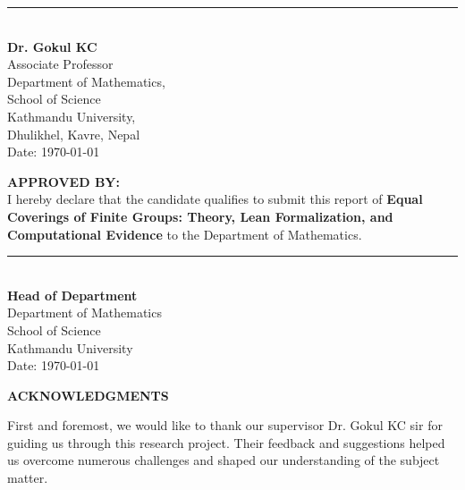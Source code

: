 \documentclass[12pt, a4paper]{article}
\theoremstyle{plain}
\theoremstyle{definition}
\begin{document}
\begin{titlepage}
\vspace{3em}

\noindent
\begin{minipage}{0.45\textwidth}
\rule{6cm}{0.5pt}\\
\textbf{Dr. Gokul KC }\\
Associate Professor\\
Department of Mathematics,\\
School of Science\\ Kathmandu University,\\
Dhulikhel, Kavre, Nepal\\
Date: {\today}

\end{minipage}


\vspace{2.5em}

\noindent

\textbf{APPROVED BY:}\\
I hereby declare that the candidate qualifies to submit this report of \textbf{Equal Coverings of Finite Groups:
Theory, Lean Formalization, and
Computational Evidence} to the Department of Mathematics.

\vspace{1.7em}

\noindent
\rule{6cm}{0.5pt}\\ 
\textbf{Head of Department }\\
Department of Mathematics\\
School of Science\\
Kathmandu University\\
Date: {\today}

\vspace{2em}


\newpage
\thispagestyle{empty}
\begin{center}
    \textbf{\LARGE ACKNOWLEDGMENTS}
\end{center}
\raggedright
    First and foremost, we would like to thank our supervisor Dr. Gokul KC sir for guiding us through this research project.
Their feedback and suggestions helped us overcome numerous challenges and shaped
our understanding of the subject matter.

\newpage
\thispagestyle{empty}


\end{titlepage}
\end{document}
